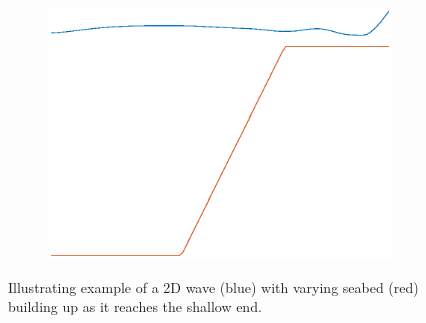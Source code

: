 \documentclass[12pt]{article}
\begin{document}
\begin{figure}[!h]
\begin{subfigure}[b]{0.24\textwidth}
\label{fig1}
\end{subfigure}
\begin{subfigure}[b]{0.24\textwidth}
\includegraphics[width=\textwidth]{fig/2dLin4.eps}
\label{fig1}
\end{subfigure}
\caption{Illustrating example of a 2D wave (blue) with varying seabed (red) building up as it reaches the shallow end.}
\label{fig:2dWave}
\end{figure}
\end{document}
